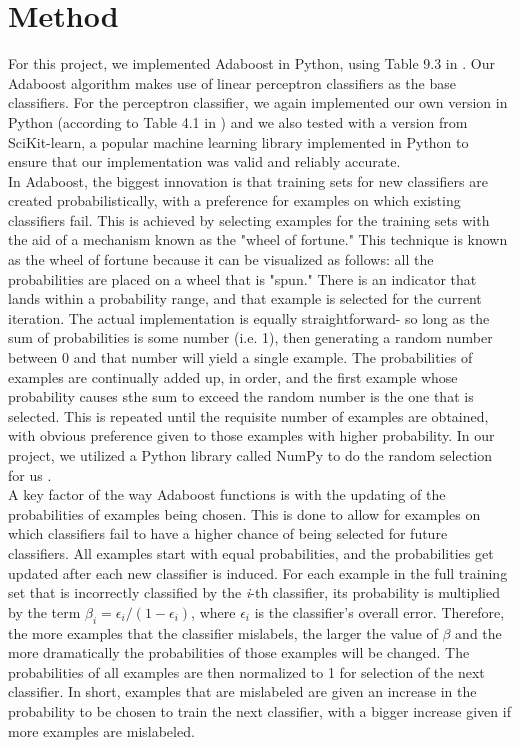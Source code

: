 \documentclass{article}
\begin{document}
\section{Method}

For this project, we implemented Adaboost in Python, using Table 9.3 in \cite{kubat}. Our Adaboost algorithm makes use of linear perceptron classifiers as the base classifiers. For the perceptron classifier, we again implemented our own version in Python (according to Table 4.1 in \cite{kubat}) and we also tested with a version from SciKit-learn, a popular machine learning library implemented in Python \cite{scikit} to ensure that our implementation was valid and reliably accurate. \\

In Adaboost, the biggest innovation is that training sets for new classifiers are created probabilistically, with a preference for examples on which existing classifiers fail. This is achieved by selecting examples for the training sets with the aid of a mechanism known as the "wheel of fortune." This technique is known as the wheel of fortune because it can be visualized as follows: all the probabilities are placed on a wheel that is "spun." There is an indicator that lands within a probability range, and that example is selected for the current iteration. The actual implementation is equally straightforward- so long as the sum of probabilities is some number (i.e. 1), then generating a random number between 0 and that number will yield a single example. The probabilities of examples are continually added up, in order, and the first example whose probability causes sthe sum to exceed the random number is the one that is selected. This is repeated until the requisite number of examples are obtained, with obvious preference given to those examples with higher probability. In our project, we utilized a Python library called NumPy to do the random selection for us \cite{numpy}. \\

A key factor of the way Adaboost functions is with the updating of the probabilities of examples being chosen. This is done to allow for examples on which classifiers fail to have a higher chance of being selected for future classifiers. All examples start with equal probabilities, and the probabilities get updated after each new classifier is induced. For each example in the full training set that is incorrectly classified by the \textit{i}-th classifier, its probability is multiplied by the term $\beta_i = \epsilon_i / (1 - \epsilon_i)$, where $\epsilon_i$ is the classifier's overall error. Therefore, the more examples that the classifier mislabels, the larger the value of $\beta$ and the more dramatically the probabilities of those examples will be changed. The probabilities of all examples are then normalized to 1 for selection of the next classifier. In short, examples that are mislabeled are given an increase in the probability to be chosen to train the next classifier, with a bigger increase given if more examples are mislabeled. \\
\end{document}
